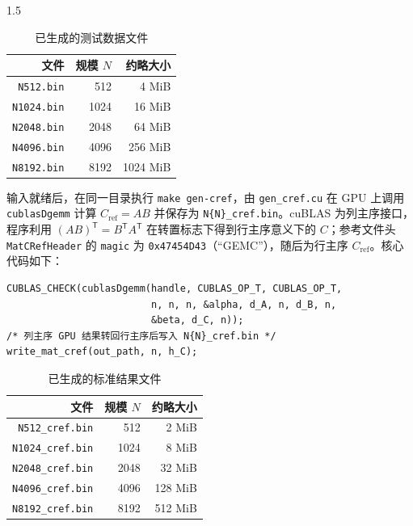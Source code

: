 \documentclass[zihao=-4]{ctexart}
\begin{document}
\begin{spacing}{1.5}
\begin{table}[H]
\small
\centering
\caption{已生成的测试数据文件}
\label{tab:data-output}
\begin{tabular}{rrr}
\toprule
文件 & 规模 $N$ & 约略大小 \\
\midrule
\protect\texttt{N512.bin}   & 512  & 4 MiB \\
\protect\texttt{N1024.bin}  & 1024 & 16 MiB \\
\protect\texttt{N2048.bin}  & 2048 & 64 MiB \\
\protect\texttt{N4096.bin}  & 4096 & 256 MiB \\
\protect\texttt{N8192.bin}  & 8192 & 1024 MiB \\
\bottomrule
\end{tabular}
\end{table}

输入就绪后，在同一目录执行 \protect\texttt{make gen-cref}，由 \protect\texttt{gen\_cref.cu} 在 GPU 上调用 \protect\texttt{cublasDgemm} 计算 $C_{\mathrm{ref}}=AB$ 并保存为 \protect\texttt{N\{N\}\_cref.bin}。cuBLAS 为列主序接口，程序利用 $(AB)^{\mathsf T}=B^{\mathsf T}A^{\mathsf T}$ 在转置标志下得到行主序意义下的 $C$；参考文件头 \protect\texttt{MatCRefHeader} 的 \protect\texttt{magic} 为 \protect\texttt{0x47454D43}（``GEMC''），随后为行主序 $C_{\mathrm{ref}}$。核心代码如下：

\begin{lstlisting}[caption={cuBLAS 计算参考结果（\protect\texttt{gen\_cref.cu} 节选）}]
CUBLAS_CHECK(cublasDgemm(handle, CUBLAS_OP_T, CUBLAS_OP_T,
                         n, n, n, &alpha, d_A, n, d_B, n,
                         &beta, d_C, n));
/* 列主序 GPU 结果转回行主序后写入 N{N}_cref.bin */
write_mat_cref(out_path, n, h_C);
\end{lstlisting}

\begin{table}[H]
\small
\centering
\caption{已生成的标准结果文件}
\label{tab:cref-output}
\begin{tabular}{rrr}
\toprule
文件 & 规模 $N$ & 约略大小 \\
\midrule
\protect\texttt{N512\_cref.bin}   & 512  & 2 MiB \\
\protect\texttt{N1024\_cref.bin}  & 1024 & 8 MiB \\
\protect\texttt{N2048\_cref.bin}  & 2048 & 32 MiB \\
\protect\texttt{N4096\_cref.bin}  & 4096 & 128 MiB \\
\protect\texttt{N8192\_cref.bin}  & 8192 & 512 MiB \\
\bottomrule
\end{tabular}
\end{table}


\end{spacing}
\end{document}
